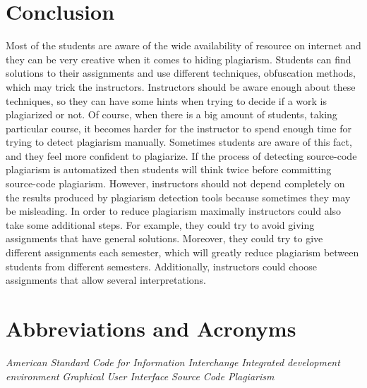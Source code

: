 \documentclass[12pt]{article}
\begin{document}
\section{Conclusion}\label{sec:Conclusion}
Most of the students are aware of the wide availability of resource on internet and they can be very creative when it comes to hiding plagiarism. Students can find solutions to their assignments and use different techniques, obfuscation methods, which may trick the instructors. Instructors should be aware enough about these techniques, so they can have some hints when trying to decide if a work is plagiarized or not. Of course, when there is a big amount of students, taking particular course, it becomes harder for the instructor to spend enough time for trying to detect plagiarism manually. Sometimes students are aware of this fact, and they feel more confident to plagiarize. If the process of detecting source-code plagiarism is automatized then students will think twice before committing source-code plagiarism. However, instructors should not depend completely on the results produced by plagiarism detection tools because sometimes they may be misleading. In order to reduce plagiarism maximally instructors could also take some additional steps. For example, they could try to avoid giving assignments that have general solutions. Moreover, they could try to give different assignments each semester, which will greatly reduce plagiarism between students from different semesters. Additionally, instructors could choose assignments that allow several interpretations. 

\newpage
\section*{Abbreviations and Acronyms}
\begin{acronym}[Bash]
 {\textit{American Standard Code for Information Interchange}}
 {\textit{Integrated development environment}}
 {\textit{Graphical User Interface}}
 {\textit{Source Code Plagiarism}}

\end{acronym}

\listoftables
\listoffigures


\end{document}
